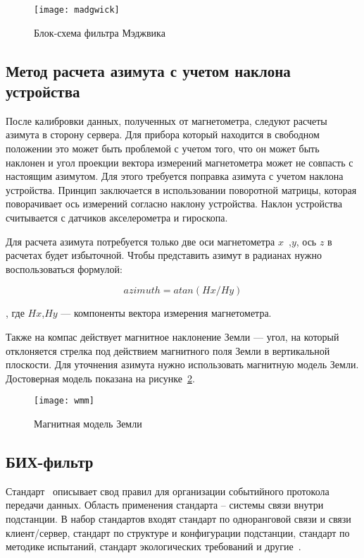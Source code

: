 \begin{figure}[ht]
    \centering
    \texttt{[image: madgwick]}
    \caption{Блок-схема фильтра Мэджвика}
    \label{pic::domain::madgwick}
\end{figure}

\subsection{Метод расчета азимута с учетом наклона устройства}

После калибровки данных, полученных от магнетометра, следуют расчеты азимута в сторону сервера.
Для прибора который находится в свободном положении это может быть проблемой с учетом того, что
он может быть наклонен и угол проекции вектора измерений магнетометра может не совпасть с настоящим азимутом.
Для этого требуется поправка азимута с учетом наклона устройства. Принцип заключается в использовании 
поворотной матрицы, которая поворачивает ось измерений согласно наклону устройства. Наклон устройства 
считывается с датчиков акселерометра и гироскопа.

Для расчета азимута потребуется только две оси магнетометра $x$~,$y$, ось $z$ в расчетах будет избыточной.
Чтобы представить азимут в радианах нужно воспользоваться формулой:

$$ azimuth = atan(Hx/Hy)$$

, где $Hx$,$Hy$ --- компоненты вектора измерения магнетометра. 

Также на компас действует магнитное наклонение Земли --- угол, на который отклоняется стрелка под действием 
магнитного поля Земли в вертикальной плоскости. Для уточнения азимута нужно использовать магнитную модель Земли.
Достоверная модель показана на рисунке~\ref{pic::domain::wmm}.

\begin{figure}[ht]
    \centering
    \texttt{[image: wmm]}
    \caption{Магнитная модель Земли}
    \label{pic::domain::wmm}
\end{figure}

\subsection{БИХ-фильтр}

Стандарт \iecStd\ описывает свод правил для организации событийного протокола
передачи данных. Область применения стандарта -- системы связи внутри подстанции.
В набор стандартов входят стандарт по одноранговой связи и связи клиент/сервер,
стандарт по структуре и конфигурации подстанции, стандарт по методике испытаний,
стандарт экологических требований и другие~\cite{iec_description}.

